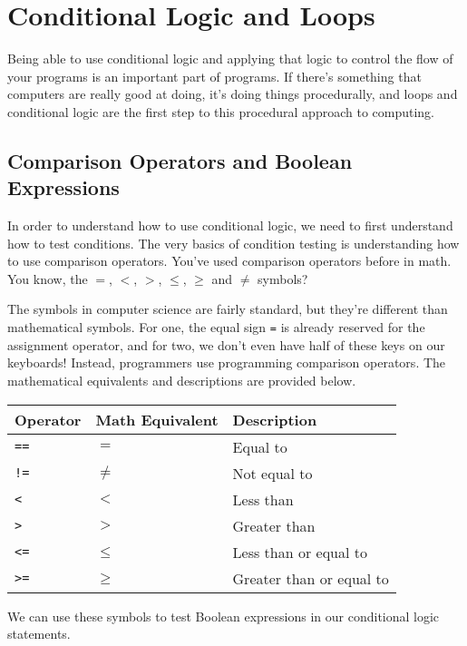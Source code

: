 \chapter{Conditional Logic and Loops}
Being able to use conditional logic and applying that logic to control the flow of your programs is an important part of programs. If there's something that computers are really good at doing, it's doing things procedurally, and loops and conditional logic are the first step to this procedural approach to computing.\par
\section{Comparison Operators and Boolean Expressions}
In order to understand how to use conditional logic, we need to first understand how to test conditions. The very basics of condition testing is understanding how to use comparison operators. You've used comparison operators before in math. You know, the $=$, $<$, $>$, $\leq$, $\geq$ and $\neq$ symbols?\par
The symbols in computer science are fairly standard, but they're different than mathematical symbols. For one, the equal sign \verb|=| is already reserved for the assignment operator, and for two, we don't even have half of these keys on our keyboards! Instead, programmers use programming comparison operators. The mathematical equivalents and descriptions are provided below.\par
\vspace{5mm}
\begin{tabular}{|l|l|l|}
\hline
Operator  & Math Equivalent & Description              \\
\hline
\verb|==| & $=$             & Equal to                 \\
\hline
\verb|!=| & $\neq$          & Not equal to             \\
\hline
\verb|<|  & $<$             & Less than                \\
\hline
\verb|>|  & $>$             & Greater than             \\
\hline
\verb|<=| & $\leq$          & Less than or equal to    \\
\hline
\verb|>=| & $\geq$          & Greater than or equal to \\
\hline
\end{tabular}\par
\vspace{5mm}
We can use these symbols to test Boolean expressions in our conditional logic statements.\par
